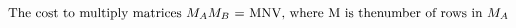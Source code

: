 \documentclass[preview]{standalone}
\begin{document}
\begin{align*}
\text{The cost to multiply matrices } M_{A} M_{B} \text{ = MNV, where M is the \newline number of rows in } M_{A}
\end{align*}
\end{document}
